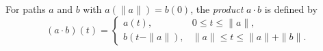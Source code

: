 For paths $a$ and $b$ with $a(\|a\|) = b(0)$, the \textit{product} $a \cdot b$ is defined by
$$(a \cdot b)(t) = \begin{cases} a(t), & 0 \leq t \leq \|a\|, \\ b(t - \|a\|), & \|a\| \leq t \leq \|a\| + \|b\|. \end{cases}$$
